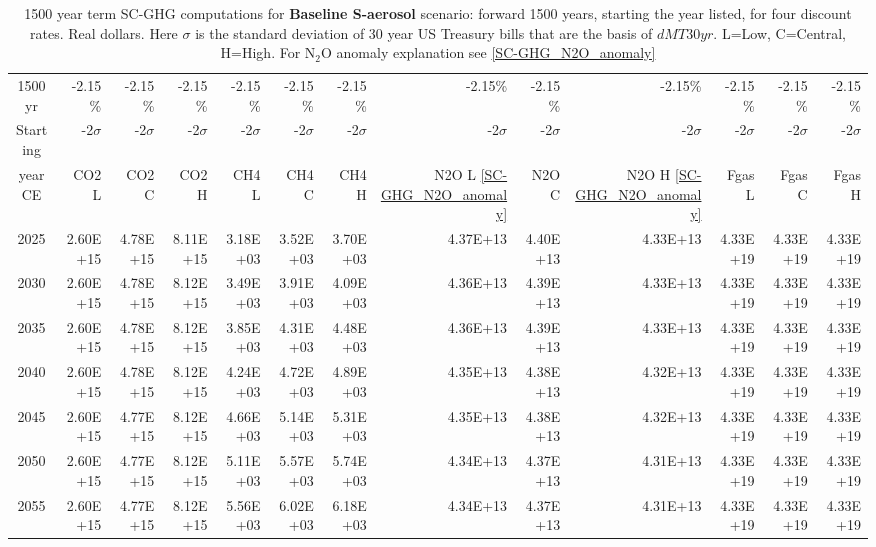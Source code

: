 \documentclass{article}
\begin{document}
\begin{table}
   \caption{1500 year term SC-GHG computations for \textbf{Baseline S-aerosol} scenario:  forward 1500 years, starting the year listed, for four discount rates. Real dollars. Here $\sigma$ is the standard deviation of 30 year US Treasury bills that are the basis of $dMT30yr$. L=Low, C=Central, H=High. For N$_2$O anomaly explanation see \ref{SC-GHG_N2O_anomaly}} 
\label{PVs_1500_yearSCC_BH1}
\small
\begin{tabular}{crrr|rrr|rrr|rrr}
1500 yr  & -2.15\%    & -2.15\%    & -2.15\%    & -2.15\%    & -2.15\%    & -2.15\%    & -2.15\%    & -2.15\%    & -2.15\%    & -2.15\%    & -2.15\%    & -2.15\%    \\
Starting & -2$\sigma$ & -2$\sigma$ & -2$\sigma$ & -2$\sigma$ & -2$\sigma$ & -2$\sigma$ & -2$\sigma$ & -2$\sigma$ & -2$\sigma$ & -2$\sigma$ & -2$\sigma$ & -2$\sigma$ \\
year CE  & CO2 L      & CO2 C      & CO2 H      & CH4 L      & CH4 C      & CH4 H      & N2O L \ref{SC-GHG_N2O_anomaly}     & N2O C      & N2O H \ref{SC-GHG_N2O_anomaly}      & Fgas L     & Fgas C     & Fgas H     \\
2025     & 2.60E+15   & 4.78E+15   & 8.11E+15   & 3.18E+03   & 3.52E+03   & 3.70E+03   & 4.37E+13   & 4.40E+13   & 4.33E+13   & 4.33E+19   & 4.33E+19   & 4.33E+19   \\
2030     & 2.60E+15   & 4.78E+15   & 8.12E+15   & 3.49E+03   & 3.91E+03   & 4.09E+03   & 4.36E+13   & 4.39E+13   & 4.33E+13   & 4.33E+19   & 4.33E+19   & 4.33E+19   \\
2035     & 2.60E+15   & 4.78E+15   & 8.12E+15   & 3.85E+03   & 4.31E+03   & 4.48E+03   & 4.36E+13   & 4.39E+13   & 4.33E+13   & 4.33E+19   & 4.33E+19   & 4.33E+19   \\
2040     & 2.60E+15   & 4.78E+15   & 8.12E+15   & 4.24E+03   & 4.72E+03   & 4.89E+03   & 4.35E+13   & 4.38E+13   & 4.32E+13   & 4.33E+19   & 4.33E+19   & 4.33E+19   \\
2045     & 2.60E+15   & 4.77E+15   & 8.12E+15   & 4.66E+03   & 5.14E+03   & 5.31E+03   & 4.35E+13   & 4.38E+13   & 4.32E+13   & 4.33E+19   & 4.33E+19   & 4.33E+19   \\
2050     & 2.60E+15   & 4.77E+15   & 8.12E+15   & 5.11E+03   & 5.57E+03   & 5.74E+03   & 4.34E+13   & 4.37E+13   & 4.31E+13   & 4.33E+19   & 4.33E+19   & 4.33E+19   \\
2055     & 2.60E+15   & 4.77E+15   & 8.12E+15   & 5.56E+03   & 6.02E+03   & 6.18E+03   & 4.34E+13   & 4.37E+13   & 4.31E+13   & 4.33E+19   & 4.33E+19   & 4.33E+19   \\

\end{tabular}
\end{table}
\end{document}
